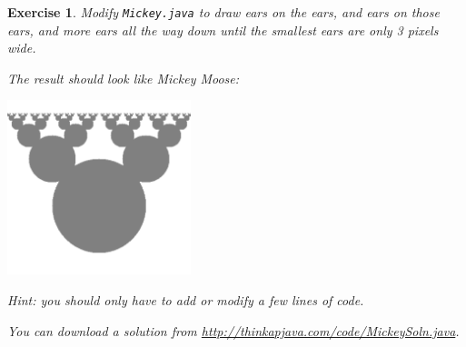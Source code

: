 \documentclass[12pt]{book}
\theoremstyle{exercise}
\newtheorem{exercise}{Exercise}[chapter]
\begin{document}
\begin{exercise}
Modify {\tt Mickey.java} to draw ears on the ears, and ears on those
ears, and more ears all the way down until the smallest ears are
only 3 pixels wide.

The result should look like Mickey Moose:

\includegraphics[height=2in]{figs/moose.pdf}

Hint: you should only have to add or modify a few lines of code.

You can download a solution from
\url{http://thinkapjava.com/code/MickeySoln.java}.

\end{exercise}
\end{document}

